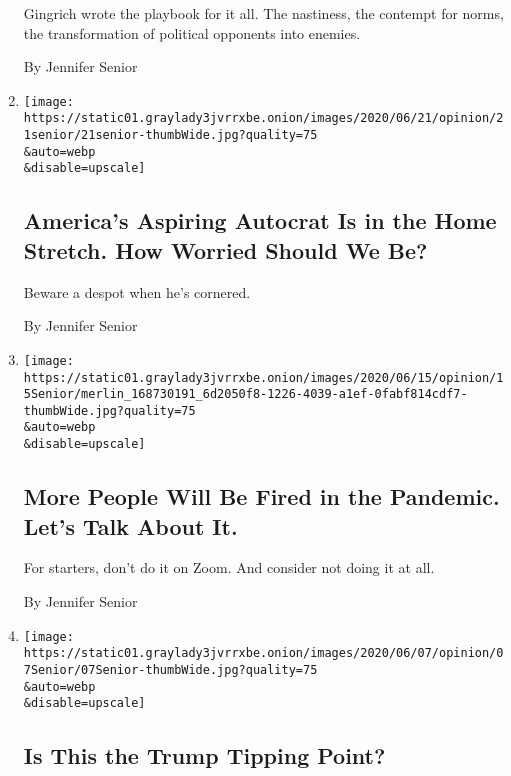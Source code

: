 \begin{enumerate}
  Gingrich wrote the playbook for it all. The nastiness, the contempt
  for norms, the transformation of political opponents into enemies.

  By Jennifer Senior
\item
  \href{/2020/06/21/opinion/trump-autocrat-barr.html}{}

  \texttt{[image: https://static01.graylady3jvrrxbe.onion/images/2020/06/21/opinion/21senior/21senior-thumbWide.jpg?quality=75\\\&auto=webp\\\&disable=upscale]}

  \hypertarget{americas-aspiring-autocrat-is-in-the-home-stretch-how-worried-should-we-be}{%
  \subsection{America's Aspiring Autocrat Is in the Home Stretch. How
  Worried Should We
  Be?}\label{americas-aspiring-autocrat-is-in-the-home-stretch-how-worried-should-we-be}}

  Beware a despot when he's cornered.

  By Jennifer Senior
\item
  \href{/2020/06/14/opinion/layoffs-coronavirus-economy.html}{}

  \texttt{[image: https://static01.graylady3jvrrxbe.onion/images/2020/06/15/opinion/15Senior/merlin\_168730191\_6d2050f8-1226-4039-a1ef-0fabf814cdf7-thumbWide.jpg?quality=75\\\&auto=webp\\\&disable=upscale]}

  \hypertarget{more-people-will-be-fired-in-the-pandemic-lets-talk-about-it}{%
  \subsection{More People Will Be Fired in the Pandemic. Let's Talk
  About
  It.}\label{more-people-will-be-fired-in-the-pandemic-lets-talk-about-it}}

  For starters, don't do it on Zoom. And consider not doing it at all.

  By Jennifer Senior
\item
  \href{/2020/06/07/opinion/trump-mattis-polls.html}{}

  \texttt{[image: https://static01.graylady3jvrrxbe.onion/images/2020/06/07/opinion/07Senior/07Senior-thumbWide.jpg?quality=75\\\&auto=webp\\\&disable=upscale]}

  \hypertarget{is-this-the-trump-tipping-point}{%
  \subsection{Is This the Trump Tipping
  Point?}\label{is-this-the-trump-tipping-point}}


\end{enumerate}
